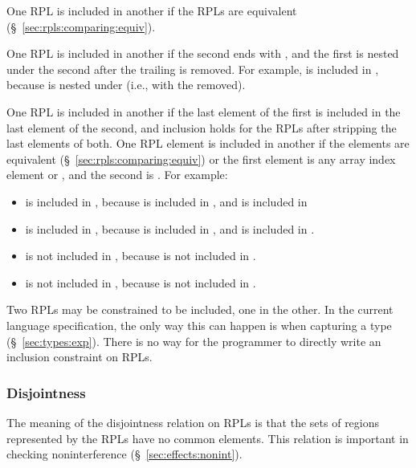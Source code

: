   One RPL is included in another if
the RPLs are equivalent (\S~\ref{sec:rpls:comparing:equiv}).

 One RPL is included in another
if the second ends with \kwd{*}, and the first is nested under the
second after the trailing \kwd{*} is removed.  For example,
 is included in , because  is nested
under  (i.e.,  with the \kwd{*} removed).

 One RPL is
included in another if the last element of the first is included in
the last element of the second, and inclusion holds for the RPLs after
stripping the last elements of both.  One RPL element is included in
another if the elements are equivalent
(\S~\ref{sec:rpls:comparing:equiv}) or the first element is any array
index element or \kwd{[?]}, and the second is \kwd{[?]}.  For example:
%
\begin{itemize}
%
\item {} is included in , because  is
  included in , and  is included in 
%
\item {} is included in , because \kwd{[0]} is
  included in \kwd{[?]}, and  is included in .
%
\item {} is not included in , because  is
  not included in .
%
\item {} is not included in , because \kwd{[?]}
  is not included in \kwd{[0]}.
%
\end{itemize}

 Two RPLs may be constrained to be
included, one in the other.  In the current language specification,
the only way this can happen is when capturing a type
(\S~\ref{sec:types:exp}).  There is no way for the programmer to
directly write an inclusion constraint on RPLs.

\subsubsection{Disjointness%
\label{sec:rpls:comparing:disjoint}}

The meaning of the disjointness relation on RPLs is that the sets of
regions represented by the RPLs have no common elements.  This
relation is important in checking noninterference
(\S~\ref{sec:effects:nonint}).

